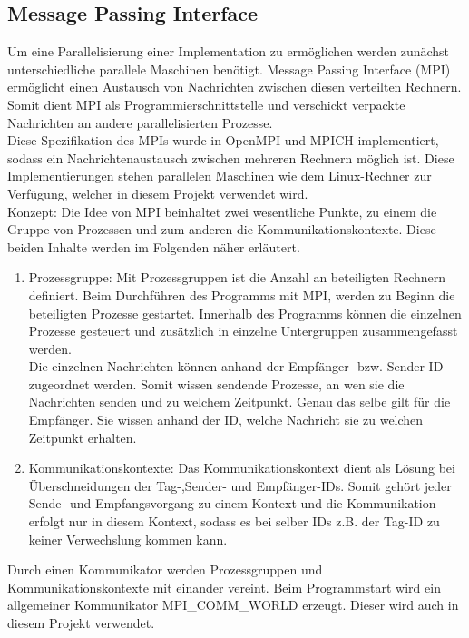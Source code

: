 \subsection{Message Passing Interface}
Um eine Parallelisierung einer Implementation zu ermöglichen werden zunächst unterschiedliche parallele Maschinen benötigt.
Message Passing Interface (MPI) ermöglicht einen Austausch von Nachrichten zwischen diesen verteilten Rechnern. Somit dient MPI als Programmierschnittstelle und verschickt verpackte Nachrichten an andere parallelisierten Prozesse.\\
Diese Spezifikation des MPIs wurde in OpenMPI und MPICH implementiert, sodass ein Nachrichtenaustausch zwischen mehreren Rechnern möglich ist. 
Diese Implementierungen stehen parallelen Maschinen wie dem Linux-Rechner zur Verfügung, welcher in diesem Projekt verwendet wird.\\ 
Konzept: Die Idee von MPI beinhaltet zwei wesentliche Punkte, zu einem die Gruppe von Prozessen und zum anderen die Kommunikationskontexte. Diese beiden Inhalte werden im Folgenden näher erläutert.
\begin{enumerate}
	\item Prozessgruppe: Mit Prozessgruppen ist die Anzahl an beteiligten Rechnern definiert. Beim Durchführen des Programms mit MPI, werden zu Beginn die beteiligten Prozesse gestartet. Innerhalb des Programms können die einzelnen Prozesse gesteuert und zusätzlich in einzelne Untergruppen zusammengefasst werden. \\
	Die einzelnen Nachrichten können anhand der Empfänger- bzw. Sender-ID zugeordnet werden. Somit wissen sendende Prozesse, an wen sie die Nachrichten senden und zu welchem Zeitpunkt. Genau das selbe gilt für die Empfänger. Sie wissen anhand der ID, welche Nachricht sie zu welchen Zeitpunkt erhalten.\\
	
	\item Kommunikationskontexte: Das Kommunikationskontext dient als Lösung bei Überschneidungen der Tag-,Sender- und Empfänger-IDs. Somit gehört jeder Sende- und Empfangsvorgang zu einem Kontext und die Kommunikation erfolgt nur in diesem Kontext, sodass es bei selber IDs z.B. der Tag-ID zu keiner Verwechslung kommen kann. 
\end{enumerate}
Durch einen Kommunikator werden Prozessgruppen und Kommunikationskontexte mit einander vereint. Beim Programmstart wird ein allgemeiner Kommunikator MPI\_COMM\_WORLD erzeugt. Dieser wird auch in diesem Projekt verwendet.\\
